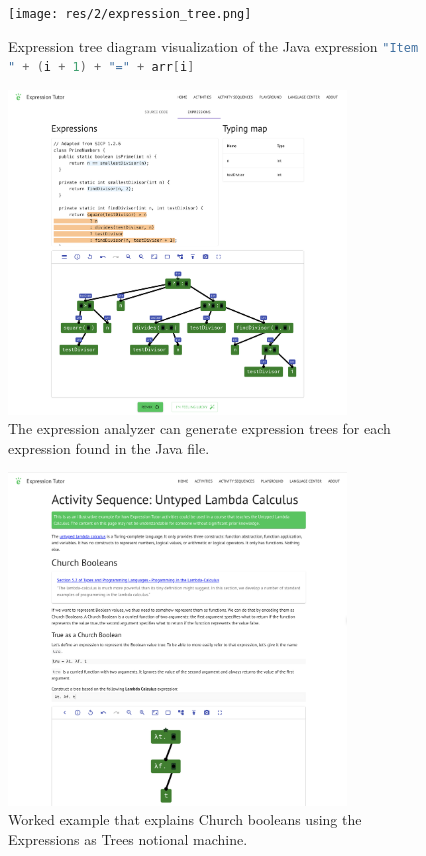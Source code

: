 \begin{chapterBody}
\begin{figure}[ht]
\centering
\texttt{[image: res/2/expression\_tree.png]}
\caption{Expression tree diagram visualization of the Java expression
\hfill\break
\lstinline[language=Java]{"Item " + (i + 1) + "=" + arr[i]}}
\label{fig:bg-etd}
\end{figure}

\begin{figure}[ht]
    \centering
    \includegraphics[width=0.8\textwidth]{res/2/et_analyzer.png}
    \caption{The expression analyzer can generate expression trees for each
expression found in the Java file.}
    \label{fig:bg-et-analyzer}
\end{figure}

\begin{figure}[ht]
    \centering
    \includegraphics[width=0.8\textwidth]{res/2/et_worked_example.png}
    \caption{Worked example that explains Church booleans using the
Expressions as Trees notional machine.}
    \label{fig:bg-et-we}
\end{figure}


\end{chapterBody}
